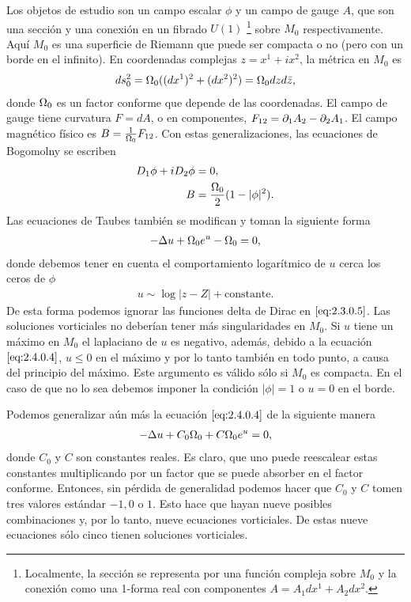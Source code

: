 Los objetos de estudio son un campo escalar $\phi$ y un campo de gauge $A$, que son una sección y una conexión en un fibrado $U(1)$ \footnote{Localmente, la sección se representa por una función compleja sobre $M_0$ y la conexión como una 1-forma real con componentes $A=A_1dx^1+A_2dx^2$.} sobre $M_0$ respectivamente. Aquí $M_0$ es una superficie de Riemann que puede ser compacta o no (pero con un borde en el infinito). En coordenadas complejas $z=x^1+ix^2$, la métrica en $M_0$ es
\begin{align}
    ds_0^2 = \Omega_0((dx^1)^2+(dx^2)^2)=\Omega_0 dzd\bar z, \label{2.4.0.1}
\end{align}
donde $\Omega_0$ es un factor conforme que depende de las coordenadas. El campo de gauge tiene curvatura $F=dA$, o en componentes, $F_{12}=\partial_1 A_2-\partial_2 A_1$. El campo magnético físico es $B=\frac{1}{\Omega_0}F_{12}$. Con estas generalizaciones, las ecuaciones de Bogomolny se escriben
\begin{align}
    D_1\phi+iD_2\phi &= 0, \label{2.4.0.2}\\
    B &= \frac{\Omega_0}{2}(1-|\phi|^2).\label{2.4.0.3}
\end{align}
Las ecuaciones de Taubes también se modifican y toman la siguiente forma
\begin{align}
    -\Delta u+\Omega_0 e^{u}-\Omega_0 =0, \label{eq:2.4.0.4}
\end{align}
donde debemos tener en cuenta el comportamiento logarítmico de $u$ cerca los ceros de $\phi$
\begin{align}
    u\sim \log |z-Z|+\text{constante}. \label{eq:2.4.0.5}
\end{align}
De esta forma podemos ignorar las funciones delta de Dirac en $\eqref{eq:2.3.0.5}$. Las soluciones vorticiales no deberían tener más singularidades en $M_0$. Si $u$ tiene un máximo en $M_0$ el laplaciano de $u$ es negativo, además, debido a la ecuación $\eqref{eq:2.4.0.4}$, $u\leq 0$ en el máximo y por lo tanto también en todo punto, a causa del principio del máximo. Este argumento es válido sólo si $M_0$ es compacta. En el caso de que no lo sea debemos imponer la condición $|\phi|=1$ o $u=0$ en el borde.

Podemos generalizar aún más la ecuación $\eqref{eq:2.4.0.4}$ de la siguiente manera
\begin{align}
    -\Delta u+C_0\Omega_0+C\Omega_0 e^{u} =0, \label{eq:2.4.0.6}
\end{align}
donde $C_0$ y $C$ son constantes reales. Es claro, que uno puede reescalear estas constantes multiplicando por un factor que se puede absorber en el factor conforme. Entonces, sin pérdida de generalidad podemos hacer que $C_0$ y $C$ tomen tres valores estándar $-1,0$ o $1$. Esto hace que hayan nueve posibles combinaciones y, por lo tanto, nueve ecuaciones vorticiales.  De estas nueve ecuaciones sólo cinco tienen soluciones vorticiales.

